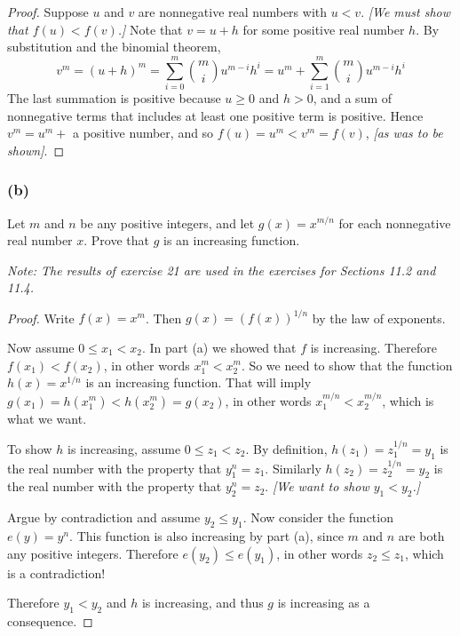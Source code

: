 \documentclass[14pt]{extarticle}
\begin{document}
\begin{proof}
Suppose \(u\) and \(v\) are nonnegative real numbers with \(u < v\). {\it [We must show that \(f(u) < f(v)\).]} Note that 
\(v = u + h\) for some positive real number \(h\). By substitution and the binomial theorem,
\[
v^m = (u+h)^m = \sum_{i = 0}^{m}\binom{m}{i} u^{m-i} h^i = u^m + \sum_{i = 1}^{m}\binom{m}{i} u^{m-i} h^i
\]
The last summation is positive because \(u \geq 0\) and \(h > 0\), and a sum of nonnegative terms that includes at least one 
positive term is positive. Hence \(v^m = u^m +\) a positive number, and so \(f(u) = u^m < v^m = f(v)\),
{\it [as was to be shown]}.
\end{proof}

\subsubsection{(b)}
Let \(m\) and \(n\) be any positive integers, and let \(g(x) = x^{m/n}\) for each nonnegative real number \(x\). Prove that 
\(g\) is an increasing function. 

{\it Note: The results of exercise 21 are used in the exercises for Sections 11.2 and 11.4.}

\begin{proof}
Write \(f(x) = x^m\). Then \(g(x) = (f(x))^{1/n}\) by the law of exponents. 

Now assume \(0 \leq x_1 < x_2\). In part (a) we showed that \(f\) is increasing. Therefore \(f(x_1) < f(x_2)\), in other 
words \(x_1^m < x_2^m\). So we need to show that the function \(h(x) = x^{1/n}\) is an increasing function. That will imply
\(g(x_1) = h(x_1^m) < h(x_2^m) = g(x_2)\), in other words \(x_1^{m/n} < x_2^{m/n}\), which is what we want.

To show \(h\) is increasing, assume \(0 \leq z_1 < z_2\). By definition, \(h(z_1) = z_1^{1/n} = y_1\) is the real number
with the property that \(y_1^n = z_1\). Similarly \(h(z_2) = z_2^{1/n} = y_2\) is the real number with the property that 
\(y_2^n = z_2\). {\it [We want to show \(y_1 < y_2\).]}

Argue by contradiction and assume \(y_2 \leq y_1\). Now consider the function \(e(y) = y^n\). This function is also
increasing by part (a), since \(m\) and \(n\) are both any positive integers. Therefore \(e(y_2) \leq e(y_1)\), in other
words \(z_2 \leq z_1\), which is a contradiction!

Therefore \(y_1 < y_2\) and \(h\) is increasing, and thus \(g\) is increasing as a consequence.
\end{proof}
\end{document}
